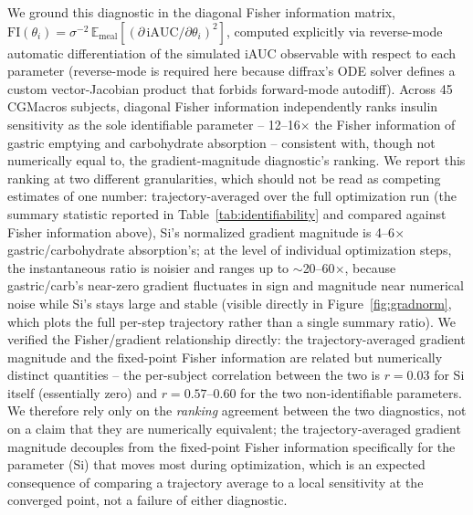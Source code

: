 \documentclass[letterpaper]{article} %
\begin{document}
We ground this diagnostic in the diagonal Fisher information matrix,
$\mathrm{FI}(\theta_i) = \sigma^{-2}\,\mathbb{E}_{\text{meal}}\left[(\partial\,\mathrm{iAUC}/\partial
\theta_i)^2\right]$, computed explicitly via reverse-mode automatic differentiation of the
simulated iAUC observable with respect to each parameter (reverse-mode is required here because
diffrax's ODE solver defines a custom vector-Jacobian product that forbids forward-mode autodiff).
Across 45 CGMacros subjects, diagonal Fisher information independently ranks insulin sensitivity as
the sole identifiable parameter -- 12--16$\times$ the Fisher information of gastric emptying and
carbohydrate absorption -- consistent with, though not numerically equal to, the gradient-magnitude
diagnostic's ranking. We report this ranking at two different granularities, which should not be
read as competing estimates of one number: trajectory-averaged over the full optimization run (the
summary statistic reported in Table~\ref{tab:identifiability} and compared against Fisher
information above), Si's normalized gradient magnitude is 4--6$\times$ gastric/carbohydrate
absorption's; at the level of individual optimization steps, the instantaneous ratio is noisier and
ranges up to $\sim$20--60$\times$, because gastric/carb's near-zero gradient fluctuates in sign and
magnitude near numerical noise while Si's stays large and stable (visible directly in
Figure~\ref{fig:gradnorm}, which plots the full per-step trajectory rather than a single summary
ratio). We verified the Fisher/gradient relationship directly: the trajectory-averaged gradient magnitude
and the fixed-point Fisher information are related but numerically distinct quantities -- the
per-subject correlation between the two is $r=0.03$ for Si itself (essentially zero) and
$r=0.57$--$0.60$ for the two non-identifiable parameters. We therefore rely only on the
\emph{ranking} agreement between the two diagnostics, not on a claim that they are numerically
equivalent; the trajectory-averaged gradient magnitude decouples from the fixed-point Fisher
information specifically for the parameter (Si) that moves most during optimization, which is an
expected consequence of comparing a trajectory average to a local sensitivity at the converged
point, not a failure of either diagnostic.
\end{document}
